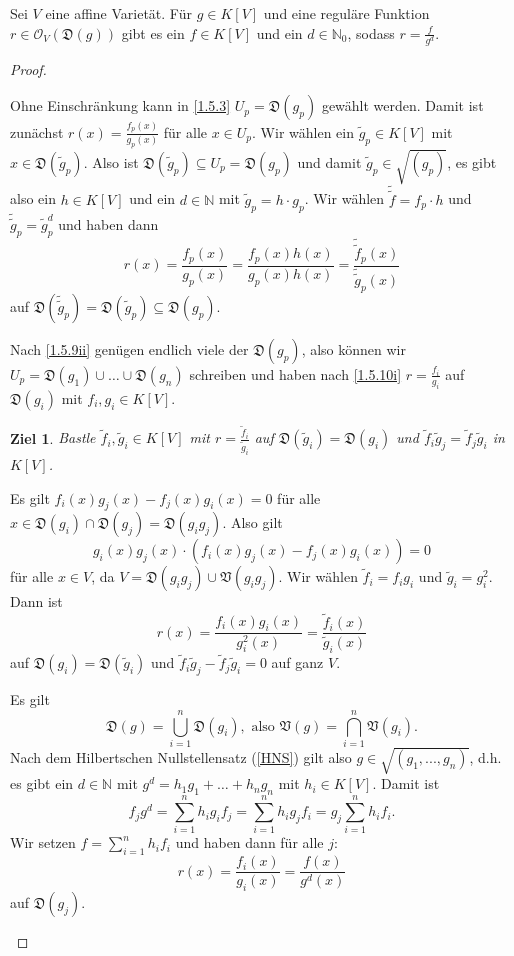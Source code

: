 \documentclass[a4paper,12pt]{scrbook}
\newtheorem{ziel}{Ziel}
\newtheorem{proof}{Beweis}
\def\V{\mathfrak{V}}
\def\O{\mathcal{O}}
\newcommand{\D}{\mathfrak{D}}
\renewcommand{\dotsc}{\ensuremath{\!...}}
\newcommand{\set}[1]{\ensuremath{\mathbb{#1}}}
\newcommand{\N}{\set{N}}
\begin{document}
\begin{prop}\label{1.5.10}
  Sei $V$ eine affine Varietät. Für $g\in K[V]$ und eine reguläre Funktion $r\in\O_V(\D(g))$ gibt es ein $f\in K[V]$ und ein
  $d\in\N_0$, sodass $r=\frac{f}{g^d}$.
\end{prop}
\begin{proof}
  \begin{prooflist}
  \item{} Ohne Einschränkung kann in \cref{1.5.3} $U_p=\D(g_p)$ gewählt werden. Damit ist zunächst
    $r(x)=\frac{f_p(x)}{g_p(x)}$ für alle $x\in U_p$. Wir wählen ein $\tilde{g}_p\in K[V]$ mit $x\in \D(\tilde{g}_p)$. Also ist
    $\D(\tilde{g}_p)\subseteq U_p=\D(g_p)$ und damit $\tilde{g}_p\in\sqrt{(g_p)}$, es gibt also ein $h\in K[V]$ und ein $d\in\N$
    mit $\tilde{g}_p=h\cdot g_p$. Wir wählen $\tilde{\tilde{f}}=f_p\cdot h$ und $\tilde{\tilde{g}}_p=\tilde{g}_p^d$ und haben
    dann \[r(x)=\frac{f_p(x)}{g_p(x)} = \frac{f_p(x)h(x)}{g_p(x)h(x)} = \frac{\tilde{\tilde{f}}_p(x)}{\tilde{\tilde{g}}_p(x)}\]
    auf $\D(\tilde{\tilde{g}}_p)=\D(\tilde{g}_p)\subseteq \D(g_p)$.
  \item Nach \cref{1.5.9ii} genügen endlich viele der $\D(g_p)$, also können wir $U_p=\D(g_1)\cup\dotso\cup
    \D(g_n)$ schreiben und haben nach \ref{1.5.10i} $r=\frac{f_i}{g_i}$ auf $\D(g_i)$ mit $f_i,g_i\in K[V]$.
    \begin{ziel}
      Bastle $\tilde{f}_i,\tilde{g}_i\in K[V]$ mit $\displaystyle r=\frac{\tilde{f}_i}{\tilde{g}_i}$ auf $\D(\tilde{g}_i)=\D(g_i)$ und
      $\tilde{f}_i\tilde{g}_j=\tilde{f}_j\tilde{g}_i$ in $K[V]$.
    \end{ziel}
    Es gilt $f_i(x)g_j(x)-f_j(x)g_i(x)=0$ für alle $x\in \D(g_i)\cap \D(g_j)=\D(g_ig_j)$. Also gilt
    \[g_i(x)g_j(x)\cdot(f_i(x)g_j(x)-f_j(x)g_i(x))=0\] für alle $x\in V$, da $V=\D(g_ig_j)\cup\V(g_ig_j)$. Wir wählen
    $\tilde{f}_i=f_ig_i$ und $\tilde{g}_i=g_i^2$. Dann ist \[r(x)=\frac{f_i(x)g_i(x)}{g_i^2(x)} =
    \frac{\tilde{f}_i(x)}{\tilde{g}_i(x)}\] auf $\D(g_i)=\D(\tilde{g}_i)$ und $\tilde{f}_i\tilde{g}_j-\tilde{f}_j\tilde{g}_i=0$ auf
    ganz $V$.

    Es gilt \[\D(g)=\bigcup_{i=1}^n \D(g_i),\text{ also }\V(g)=\bigcap_{i=1}^n\V(g_i).\] Nach dem Hilbertschen Nullstellensatz
    (\cref{HNS}) gilt also $g\in\sqrt{(g_1,\dotsc,g_n)}$, d.h. es gibt ein $d\in\N$ mit $g^d=h_1g_1+\dotso+h_ng_n$ mit
    $h_i\in K[V]$. Damit ist
    \[ f_jg^d = \sum_{i=1}^nh_ig_if_j = \sum_{i=1}^n h_ig_jf_i = g_j\sum_{i=1}^nh_if_i. \]
    Wir setzen $f=\displaystyle\sum_{i=1}^nh_if_i$ und haben dann für alle $j$: \[r(x)=\frac{f_i(x)}{g_i(x)}=\frac{f(x)}{g^d(x)}\]
    auf $\D(g_j)$.
  \end{prooflist}
\end{proof}
\end{document}
